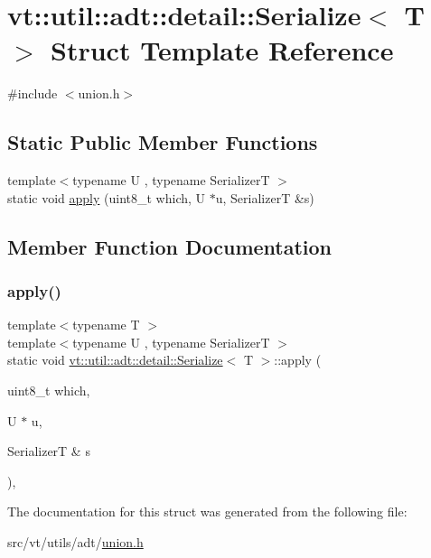 \hypertarget{structvt_1_1util_1_1adt_1_1detail_1_1_serialize_3_01_t_01_4}{}\section{vt\+:\+:util\+:\+:adt\+:\+:detail\+:\+:Serialize$<$ T $>$ Struct Template Reference}
\label{structvt_1_1util_1_1adt_1_1detail_1_1_serialize_3_01_t_01_4}


{\ttfamily \#include $<$union.\+h$>$}

\subsection*{Static Public Member Functions}
\begin{DoxyCompactItemize}
\item 
{\footnotesize template$<$typename U , typename SerializerT $>$ }\\static void \hyperlink{structvt_1_1util_1_1adt_1_1detail_1_1_serialize_3_01_t_01_4_a08d2530adc3d4178e06a7bb40786db13}{apply} (uint8\+\_\+t which, U $\ast$u, SerializerT \&s)
\end{DoxyCompactItemize}


\subsection{Member Function Documentation}
\mbox{\label{structvt_1_1util_1_1adt_1_1detail_1_1_serialize_3_01_t_01_4_a08d2530adc3d4178e06a7bb40786db13}} 
\subsubsection{\texorpdfstring{apply()}{apply()}}
{\footnotesize\ttfamily template$<$typename T $>$ \\
template$<$typename U , typename SerializerT $>$ \\
static void \hyperlink{structvt_1_1util_1_1adt_1_1detail_1_1_serialize}{vt\+::util\+::adt\+::detail\+::\+Serialize}$<$ T $>$\+::apply (\begin{DoxyParamCaption}\item[{uint8\+\_\+t}]{which,  }\item[{U $\ast$}]{u,  }\item[{SerializerT \&}]{s }\end{DoxyParamCaption})\hspace{0.3cm}{\ttfamily [inline]}, {\ttfamily [static]}}



The documentation for this struct was generated from the following file\+:\begin{DoxyCompactItemize}
\item 
src/vt/utils/adt/\hyperlink{union_8h}{union.\+h}\end{DoxyCompactItemize}
